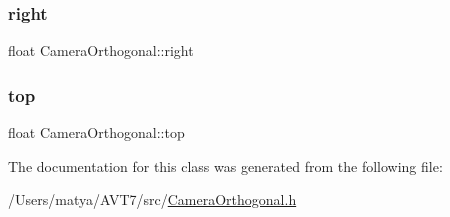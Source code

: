 \subsubsection{\texorpdfstring{right}{right}}
{\footnotesize\ttfamily float Camera\+Orthogonal\+::right}

\mbox{\label{class_camera_orthogonal_afb3bdd5249f1e5d690624812bac24dd7}} 
\subsubsection{\texorpdfstring{top}{top}}
{\footnotesize\ttfamily float Camera\+Orthogonal\+::top}



The documentation for this class was generated from the following file\+:\begin{DoxyCompactItemize}
\item 
/\+Users/matya/\+A\+V\+T7/src/\hyperlink{_camera_orthogonal_8h}{Camera\+Orthogonal.\+h}\end{DoxyCompactItemize}
